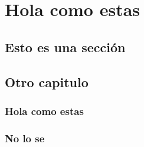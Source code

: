 \documentclass[../main.tex]{subfiles}
\begin{document}
    \chapter{Hola como estas}

    \lipsum[2]

    \section{Esto es una sección}

    \lipsum[1]

    \section{Otro capitulo}

    \lipsum[1]
    \subsection{Hola como estas}
    \subsection*{No lo se}
\end{document}
